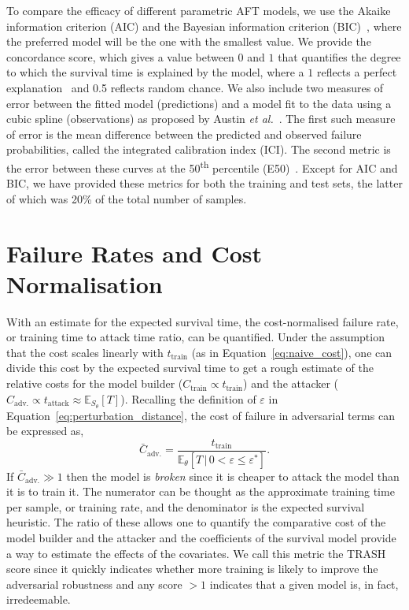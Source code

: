To compare the efficacy of different parametric AFT models, we use the Akaike information criterion (AIC) and the Bayesian information criterion (BIC)~\cite{stoica2004model}, where the preferred model will be the one with the smallest value. We provide the
concordance score, which gives a value between $0$ and $1$ that quantifies the degree to which the survival time is explained by the model, where a $1$ reflects a perfect explanation~\cite{uno2011c} and 0.5 reflects random chance. 
We also include two measures of error between the fitted model (predictions) and a model fit to the data using a cubic spline (observations) as proposed by Austin \textit{et al.}~\cite{ici}. 
The first such measure of error is the mean difference between the predicted and observed failure probabilities,  called the integrated calibration index (ICI).
The second metric is the error between these curves at the 50\textsuperscript{th} percentile (E50)~\cite{ici}. 
Except for AIC and BIC, we have provided these metrics for both the training and test sets, the latter of which was 20\% of the total number of samples.

\section{Failure Rates and Cost Normalisation}
\label{cost_normalization}

With an estimate for the expected survival time, the cost-normalised failure rate, or training time to attack time ratio, can be quantified. 
Under the assumption that the cost scales linearly with $t_{\mathrm{train}}$ (as in Equation~\ref{eq:naive_cost}), one can divide this cost by the expected survival time to get a rough estimate of the relative costs for the model builder ($C_{\mathrm{train}} \propto t_{\mathrm{train}}$) and the attacker ($C_{\mathrm{adv.}} \propto t_{\mathrm{attack}} \approx \mathbb{E}_{S_\theta}[T]$). Recalling the definition of $\varepsilon$ in Equation~\ref{eq:perturbation_distance}, the cost of failure in adversarial terms can be expressed as,
\begin{equation}
	\bar{C}_{\mathrm{adv.}}=\frac{t_{\mathrm{train}}}{\mathbb{E}_{\theta}[T \,|\, 0 < \varepsilon \leq \varepsilon^*]}.
	\label{eq:cost}
\end{equation}
If $\bar{C}_{\mathrm{adv.}} \gg 1$  then the model is \textit{broken} since it is cheaper to attack the model than it is to train it. 
The numerator can be thought as the approximate training time per sample, or training rate, and the denominator is the expected survival heuristic. 
The ratio of these allows one to quantify the comparative cost of the model builder and the attacker and the coefficients of the survival model provide a way to estimate the effects of the covariates. 
We call this metric the TRASH score since it quickly indicates whether more training is likely to improve the adversarial robustness and any score $ > 1$ indicates that a given model is, in fact, irredeemable. 

